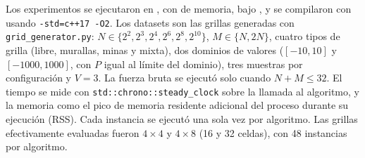 Los experimentos se ejecutaron en , con  de memoria,
bajo , y se compilaron con  usando
\texttt{-std=c++17 -O2}. Los datasets son las grillas generadas con
\texttt{grid\_generator.py}: $N\in\{2^2,2^3,2^4,2^6,2^8,2^{10}\}$,
$M\in\{N,2N\}$, cuatro tipos de grilla (libre, murallas, minas y mixta), dos
dominios de valores ($[-10,10]$ y $[-1000,1000]$, con $P$ igual al l\'imite del
dominio), tres muestras por configuraci\'on y $V=3$. La fuerza bruta se
ejecut\'o solo cuando $N+M\le 32$. El tiempo se mide con
\texttt{std::chrono::steady\_clock} sobre la llamada al algoritmo, y la memoria
como el pico de memoria residente adicional del proceso durante su ejecuci\'on
(RSS). Cada instancia se ejecut\'o una sola vez por algoritmo. Las grillas
efectivamente evaluadas fueron $4\times4$ y $4\times8$ (16 y 32 celdas), con
48 instancias por algoritmo.